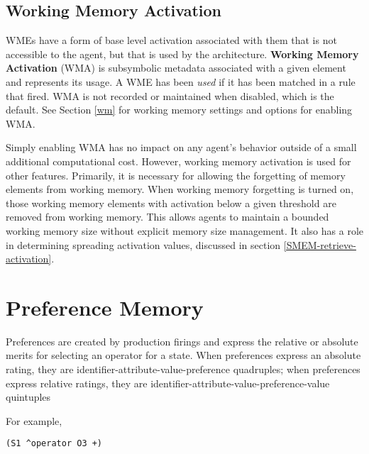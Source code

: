 \subsection{Working Memory Activation}

WMEs have a form of base level activation associated with them that is not accessible to the agent, but that is used by the architecture. \textbf{Working Memory Activation} (WMA) is subsymbolic metadata associated with a given element and represents its usage. A WME has been \textit{used} if it has been matched in a rule that fired. WMA is not recorded or maintained when disabled, which is the default. See Section \ref{wm} for working memory settings and options for enabling WMA.

Simply enabling WMA has no impact on any agent's behavior outside of a small additional computational cost. However, working memory activation is used for other features. Primarily, it is necessary for allowing the forgetting of memory elements from working memory. When working memory forgetting is turned on, those working memory elements with activation below a given threshold are removed from working memory. This allows agents to maintain a bounded working memory size without explicit memory size management. It also has a role in determining spreading activation values, discussed in section \ref{SMEM-retrieve-activation}.


\section{Preference Memory}
\label{SYNTAX-prefmem}

Preferences are created by production firings and express the relative or absolute merits for selecting an operator for a state.  When preferences express an absolute rating, they are identifier-attribute-value-preference quadruples; when preferences express relative ratings, they are identifier-attribute-value-preference-value quintuples

For example, 

\begin{verbatim}
(S1 ^operator O3 +)
\end{verbatim}

